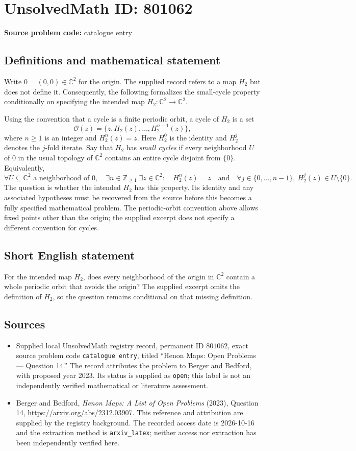 \documentclass[11pt]{article}
\newcommand{\Z}{\mathbb{Z}}
\newcommand{\C}{\mathbb{C}}
\begin{document}
\section*{UnsolvedMath ID: 801062}
\textbf{Source problem code:} catalogue entry
\subsection{Definitions and mathematical statement}
Write \(0=(0,0)\in\C^2\) for the origin. The supplied record refers to a map \(H_2\) but does not define it. Consequently, the following formalizes the small-cycle property conditionally on specifying the intended map \(H_2:\C^2\to\C^2\).

Using the convention that a cycle is a finite periodic orbit, a cycle of \(H_2\) is a set
\[
\mathcal O(z)=\{z,H_2(z),\ldots,H_2^{n-1}(z)\},
\]
where \(n\geq 1\) is an integer and \(H_2^n(z)=z\). Here \(H_2^0\) is the identity and \(H_2^j\) denotes the \(j\)-fold iterate. Say that \(H_2\) has \emph{small cycles} if every neighborhood \(U\) of \(0\) in the usual topology of \(\C^2\) contains an entire cycle disjoint from \(\{0\}\). Equivalently,
\[
\forall U\subseteq\C^2\text{ a neighborhood of }0,\quad
\exists n\in\Z_{\geq 1}\;\exists z\in\C^2:\quad
H_2^n(z)=z
\quad\text{and}\quad
\forall j\in\{0,\ldots,n-1\},\ H_2^j(z)\in U\setminus\{0\}.
\]
The question is whether the intended \(H_2\) has this property. Its identity and any associated hypotheses must be recovered from the source before this becomes a fully specified mathematical problem. The periodic-orbit convention above allows fixed points other than the origin; the supplied excerpt does not specify a different convention for cycles.
\subsection{Short English statement}
For the intended map \(H_2\), does every neighborhood of the origin in \(\C^2\) contain a whole periodic orbit that avoids the origin? The supplied excerpt omits the definition of \(H_2\), so the question remains conditional on that missing definition.
\subsection{Sources}
\begin{itemize}
\item Supplied local UnsolvedMath registry record, permanent ID \(801062\), exact source problem code \texttt{catalogue entry}, titled ``Henon Maps: Open Problems --- Question 14.'' The record attributes the problem to Berger and Bedford, with proposed year 2023. Its status is supplied as \texttt{open}; this label is not an independently verified mathematical or literature assessment.
\item Berger and Bedford, \emph{Henon Maps: A List of Open Problems} (2023), Question 14, \url{https://arxiv.org/abs/2312.03907}. This reference and attribution are supplied by the registry background. The recorded access date is 2026-10-16 and the extraction method is \texttt{arxiv\_latex}; neither access nor extraction has been independently verified here.
\end{itemize}
\end{document}

